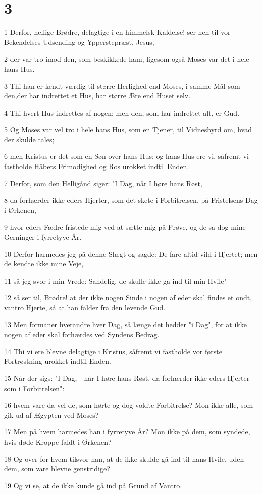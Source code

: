 \chapter{3}

\par 1 Derfor, hellige Brødre, delagtige i en himmelsk Kaldelse! ser hen til vor Bekendelses Udsending og Ypperstepræst, Jesus,
\par 2 der var tro imod den, som beskikkede ham, ligesom også Moses var det i hele hans Hus.
\par 3 Thi han er kendt værdig til større Herlighed end Moses, i samme Mål som den,der har indrettet et Hus, har større Ære end Huset selv.
\par 4 Thi hvert Hus indrettes af nogen; men den, som har indrettet alt, er Gud.
\par 5 Og Moses var vel tro i hele hans Hus, som en Tjener, til Vidnesbyrd om, hvad der skulde tales;
\par 6 men Kristus er det som en Søn over hans Hus; og hans Hus ere vi, såfremt vi fastholde Håbets Frimodighed og Ros urokket indtil Enden.
\par 7 Derfor, som den Helligånd siger: "I Dag, når I høre hans Røst,
\par 8 da forhærder ikke eders Hjerter, som det skete i Forbitrelsen, på Fristelsens Dag i Ørkenen,
\par 9 hvor eders Fædre fristede mig ved at sætte mig på Prøve, og de så dog mine Gerninger i fyrretyve År.
\par 10 Derfor harmedes jeg på denne Slægt og sagde: De fare altid vild i Hjertet; men de kendte ikke mine Veje,
\par 11 så jeg svor i min Vrede: Sandelig, de skulle ikke gå ind til min Hvile" -
\par 12 så ser til, Brødre! at der ikke nogen Sinde i nogen af eder skal findes et ondt, vantro Hjerte, så at han falder fra den levende Gud.
\par 13 Men formaner hverandre hver Dag, så længe det hedder "i Dag", for at ikke nogen af eder skal forhærdes ved Syndens Bedrag.
\par 14 Thi vi ere blevne delagtige i Kristus, såfremt vi fastholde vor første Fortrøstning urokket indtil Enden.
\par 15 Når der sigs: "I Dag, - når I høre hans Røst, da forhærder ikke eders Hjerter som i Forbitrelsen":
\par 16 hvem vare da vel de, som hørte og dog voldte Forbitrelse? Mon ikke alle, som gik ud af Ægypten ved Moses?
\par 17 Men på hvem harmedes han i fyrretyve År? Mon ikke på dem, som syndede, hvis døde Kroppe faldt i Ørkenen?
\par 18 Og over for hvem tilsvor han, at de ikke skulde gå ind til hans Hvile, uden dem, som vare blevne genstridige?
\par 19 Og vi se, at de ikke kunde gå ind på Grund af Vantro.

